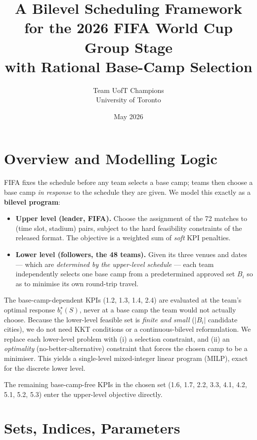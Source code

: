 \documentclass[12pt, letterpaper]{article}
\title{\textbf{A Bilevel Scheduling Framework for the 2026 FIFA World
Cup Group Stage}\\[4pt]
\large with Rational Base-Camp Selection}
\author{Team UofT Champions \\ \small University of Toronto}
\date{May 2026}
\begin{document}
\maketitle

\section{Overview and Modelling Logic}

FIFA fixes the schedule before any team selects a base camp; teams then
choose a base camp \emph{in response} to the schedule they are given.
We model this exactly as a \textbf{bilevel program}:

\begin{itemize}[leftmargin=1.4em, itemsep=2pt]
  \item \textbf{Upper level (leader, FIFA).} Choose the assignment of
        the 72 matches to (time slot, stadium) pairs, subject to the
        hard feasibility constraints of the released format. The
        objective is a weighted sum of \emph{soft} KPI penalties.
  \item \textbf{Lower level (followers, the 48 teams).} Given its three
        venues and dates --- which are \emph{determined by the upper-level
        schedule} --- each team independently selects one base camp from a
        predetermined approved set $B_i$ so as to minimise its own
        round-trip travel.
\end{itemize}

The base-camp-dependent KPIs (1.2, 1.3, 1.4, 2.4) are evaluated at the
team's optimal response $b_i^\star(S)$, never at a base camp the team
would not actually choose. Because the lower-level feasible set is
\emph{finite and small} ($|B_i|$ candidate cities), we do not need KKT
conditions or a continuous-bilevel reformulation. We replace each
lower-level problem with (i) a selection constraint, and (ii) an
\emph{optimality} (no-better-alternative) constraint that forces the
chosen camp to be a minimiser. This yields a single-level mixed-integer
linear program (MILP), exact for the discrete lower level.

\bigskip
The remaining base-camp-free KPIs in the chosen set (1.6, 1.7, 2.2, 3.3,
4.1, 4.2, 5.1, 5.2, 5.3) enter the upper-level objective directly.

\section{Sets, Indices, Parameters}
\end{document}
